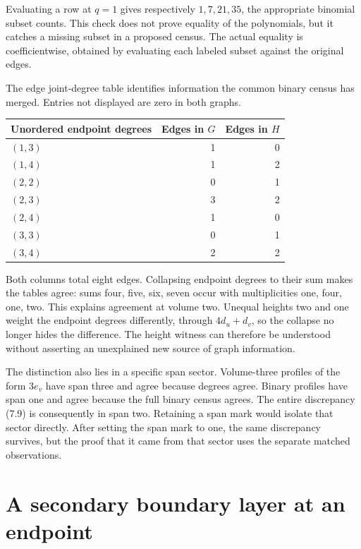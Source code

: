 \documentclass[
  11pt,
  a4paper,
]{report}
\begin{document}
Evaluating a row at \(q=1\) gives respectively \(1,7,21,35\), the
appropriate binomial subset counts. This check does not prove equality
of the polynomials, but it catches a missing subset in a proposed
census. The actual equality is coefficientwise, obtained by evaluating
each labeled subset against the original edges.

The edge joint-degree table identifies information the common binary
census has merged. Entries not displayed are zero in both graphs.

\begin{longtable}[]{@{}lrr@{}}
\toprule\noalign{}
Unordered endpoint degrees & Edges in \(G\) & Edges in \(H\) \\
\midrule\noalign{}
\endhead
\bottomrule\noalign{}
\endlastfoot
\((1,3)\) & 1 & 0 \\
\((1,4)\) & 1 & 2 \\
\((2,2)\) & 0 & 1 \\
\((2,3)\) & 3 & 2 \\
\((2,4)\) & 1 & 0 \\
\((3,3)\) & 0 & 1 \\
\((3,4)\) & 2 & 2 \\
\end{longtable}

Both columns total eight edges. Collapsing endpoint degrees to their sum
makes the tables agree: sums four, five, six, seven occur with
multiplicities one, four, one, two. This explains agreement at volume
two. Unequal heights two and one weight the endpoint degrees
differently, through \(4d_u+d_v\), so the collapse no longer hides the
difference. The height witness can therefore be understood without
asserting an unexplained new source of graph information.

The distinction also lies in a specific span sector. Volume-three
profiles of the form \(3e_v\) have span three and agree because degrees
agree. Binary profiles have span one and agree because the full binary
census agrees. The entire discrepancy (7.9) is consequently in span two.
Retaining a span mark would isolate that sector directly. After setting
the span mark to one, the same discrepancy survives, but the proof that
it came from that sector uses the separate matched observations.

\hypertarget{a-secondary-boundary-layer-at-an-endpoint}{%
\section{A secondary boundary layer at an
endpoint}\label{a-secondary-boundary-layer-at-an-endpoint}}
\end{document}
